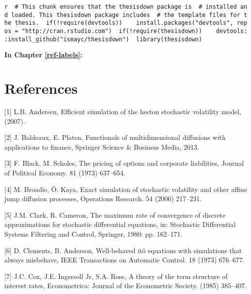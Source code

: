 \documentclass[12pt,twoside]{reedthesis}
\theoremstyle{definition}
\theoremstyle{definition}
\theoremstyle{remark}
\begin{document}
  \texttt{r\ \ \#\ This\ chunk\ ensures\ that\ the\ thesisdown\ package\ is\ \ \#\ installed\ and\ loaded.\ This\ thesisdown\ package\ includes\ \ \#\ the\ template\ files\ for\ the\ thesis.\ \ if(!require(devtools))\ \ \ \ install.packages("devtools",\ repos\ =\ "http://cran.rstudio.com")\ \ if(!require(thesisdown))\ \ \ \ devtools::install\_github("ismayc/thesisdown")\ \ library(thesisdown)}
  
  \textbf{In Chapter \ref{ref-labels}:}
  
  \backmatter
  
  \chapter*{References}\label{references}
  
  \noindent
  
  \setlength{\parindent}{-0.20in} \setlength{\leftskip}{0.20in}
  \setlength{\parskip}{8pt}
  
  \hypertarget{refs}{}
  \hypertarget{ref-andersen}{}
  {[}1{]} L.B. Andersen, Efficient simulation of the heston stochastic
  volatility model, (2007).
  
  \hypertarget{ref-baldeaux}{}
  {[}2{]} J. Baldeaux, E. Platen, Functionals of multidimensional
  diffusions with applications to finance, Springer Science \& Business
  Media, 2013.
  
  \hypertarget{ref-black1973pricing}{}
  {[}3{]} F. Black, M. Scholes, The pricing of options and corporate
  liabilities, Journal of Political Economy. 81 (1973) 637--654.
  
  \hypertarget{ref-broadie2006exact}{}
  {[}4{]} M. Broadie, Ö. Kaya, Exact simulation of stochastic volatility
  and other affine jump diffusion processes, Operations Research. 54
  (2006) 217--231.
  
  \hypertarget{ref-clark1980maximum}{}
  {[}5{]} J.M. Clark, R. Cameron, The maximum rate of convergence of
  discrete approximations for stochastic differential equations, in:
  Stochastic Differential Systems Filtering and Control, Springer, 1980:
  pp. 162--171.
  
  \hypertarget{ref-clements1973well}{}
  {[}6{]} D. Clements, B. Anderson, Well-behaved itô equations with
  simulations that always misbehave, IEEE Transactions on Automatic
  Control. 18 (1973) 676--677.
  
  \hypertarget{ref-cox1985theory}{}
  {[}7{]} J.C. Cox, J.E. Ingersoll Jr, S.A. Ross, A theory of the term
  structure of interest rates, Econometrica: Journal of the Econometric
  Society. (1985) 385--407.
  
\end{document}
